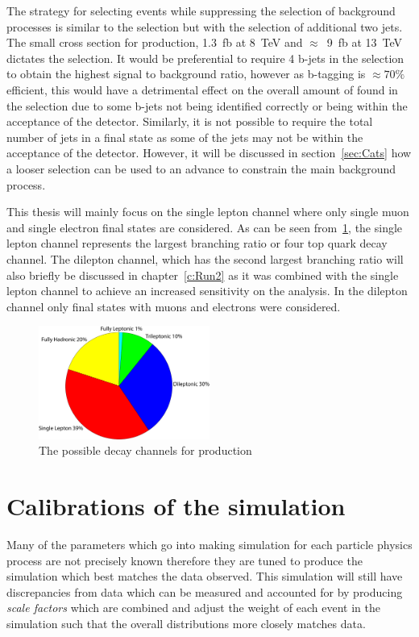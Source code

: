 The strategy for selecting \tttt events while suppressing the selection of background processes is similar to the \ttbar selection but with the selection of additional two jets. The small cross section for \tttt production, 1.3~fb at 8~TeV and $\approx$~9~fb at 13~TeV dictates the selection. It would be preferential to require 4 b-jets in the selection to obtain the highest signal to background ratio, however as b-tagging is $\approx70\%$ efficient, this would have a detrimental effect on the overall amount of \tttt found in the selection due to some b-jets not being identified correctly or being within the acceptance of the detector. Similarly, it is not possible to require the total number of jets in a \tttt final state as some of the jets may not be within the acceptance of the detector. However, it will be discussed in section~\ref{sec:Cats} how a looser selection can be used to an advance to constrain the main background process.

This thesis will mainly focus on the single lepton channel where only single muon and single electron final states are considered. As can be seen from~\ref{fig:ttttDecay}, the single lepton channel represents the largest branching ratio or four top quark decay channel. The dilepton channel, which has the second largest branching ratio will also briefly be discussed in chapter~\ref{c:Run2} as it was combined with the single lepton channel to achieve an increased sensitivity on the analysis. In the dilepton channel only final states with muons and electrons were considered.

\begin{figure}[ht!]
\centering
    \includegraphics[width=0.5\textwidth]{images/Analysis/FourTopBR.pdf}
    \caption{The possible decay channels for \tttt production}
    \label{fig:ttttDecay}
\end{figure}




\section{Calibrations of the simulation}
\label{sec:Calibrations}
Many of the parameters which go into making simulation for each particle physics process are not precisely known therefore they are tuned to produce the simulation which best matches the data observed. This simulation will still have discrepancies from data which can be measured and accounted for by producing \emph{scale factors} which are combined and adjust the weight of each event in the simulation such that the overall distributions more closely matches data. 


